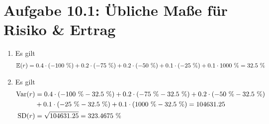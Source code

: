 \documentclass{article}
\newcommand{\E}{\mathbb{E}}
\DeclareMathOperator{\Var}{Var}
\DeclareMathOperator{\SD}{SD}
\begin{document}
	\section*{Aufgabe 10.1: Übliche Maße für Risiko \& Ertrag}
	\begin{enumerate}[label=(\alph*)]
		\item Es gilt
		\begin{align}
			\E(r) = 0.4\cdot (-100\text{ \%}) +  0.2\cdot (-75\text{ \%}) +  0.2\cdot (-50\text{ \%}) +  0.1\cdot (-25\text{ \%}) +  0.1\cdot 1000\text{ \%} = 32.5\text{ \%} \notag
		\end{align}
		\item Es gilt
		\begin{align}
			\Var(r) &=  0.4\cdot (-100\text{ \%} - 32.5\text{ \%}) +  0.2\cdot (-75\text{ \%} - 32.5\text{ \%}) +  0.2\cdot (-50\text{ \%} - 32.5\text{ \%}) \notag \\
			& +  0.1\cdot (-25\text{ \%} - 32.5\text{ \%}) +  0.1\cdot (1000\text{ \%} - 32.5\text{ \%}) = 104631.25 \notag \\
			\SD(r) &= \sqrt{104631.25} = 323.4675\text{ \%} \notag
		\end{align}
	\end{enumerate}
\end{document}
